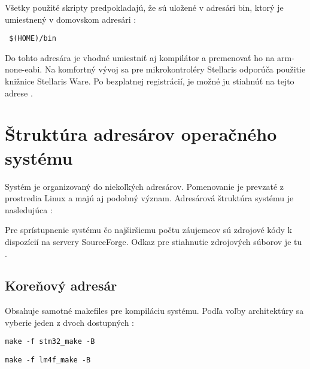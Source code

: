Všetky použité skripty predpokladajú, že sú uložené v adresári bin, ktorý je umiestnený v domovskom adresári :
{\small
\begin{verbatim}
 $(HOME)/bin
\end{verbatim}
}

Do tohto adresára je vhodné umiestniť aj kompilátor a premenovať ho na arm-none-eabi. Na komfortný vývoj sa pre mikrokontroléry Stellaris odporúča použitie knižnice Stellaris Ware. Po bezplatnej registrácií, je možné ju stiahnúť na tejto adrese \cite{stellaris_ware}.


\section{Štruktúra adresárov operačného systému}

Systém je organizovaný do niekoľkých adresárov. Pomenovanie je prevzaté z prostredia Linux a majú aj podobný význam. Adresárová štruktúra systému je nasledujúca :

\begin{figure}[ht]



\end{figure}

Pre sprístupnenie systému čo najširšiemu počtu záujemcov sú zdrojové kódy k dispozícií na servery SourceForge. Odkaz pre stiahnutie zdrojových súborov je tu \cite{suzuha_source}.

\subsection{Koreňový adresár}




Obsahuje samotné makefiles pre kompiláciu systému. Podľa voľby architektúry sa vyberie jeden z dvoch dostupných :
{\small
\begin{verbatim}
make -f stm32_make -B
\end{verbatim}
}

{\small
\begin{verbatim}
make -f lm4f_make -B
\end{verbatim}
}


